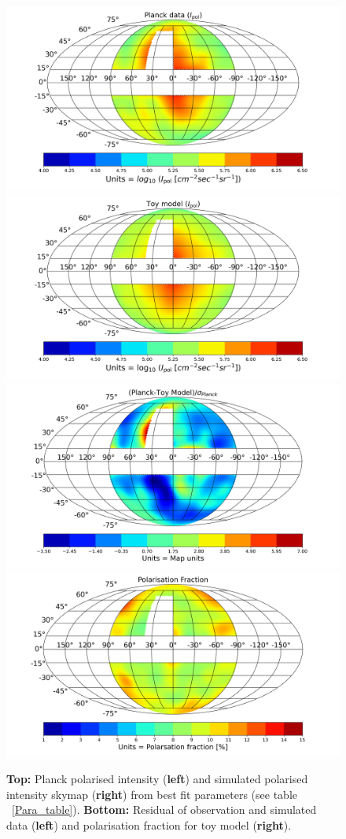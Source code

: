 \documentclass[usenatbib]{mnras}
\begin{document}
\begin{figure}
\centering
\includegraphics[width =0.49\linewidth]{Images/Feb-09-2022_Planck_Sky_Map.png}%
\includegraphics[width=0.49\linewidth]{Images/Feb-09-2022Ver1_Skymap_Bstr_3_Btur_6_Rmag_5_Zmag_7_norm_3.76e-13.png}
\includegraphics[width = 0.49\linewidth]{Images/Feb-09-2022_Residue_Bstr_3_Btur_6_Rmag_5_Zmag_7_norm_3.76e-13.png}%
\includegraphics[width =0.49\linewidth]{Images/Feb-09-2022_Pol_Frac_30GHz_Total_Skymap_Bstr_3_Btur_6_Rmag_5_Zmag_7_norm_2.61e-14.png}
\caption{\textbf{Top:} Planck polarised intensity (\textbf{left}) and simulated polarised intensity skymap (\textbf{right}) from best fit parameters (see table ~\ref{Para_table}). \textbf{Bottom:} Residual of observation and simulated data (\textbf{left}) and polarisation fraction for toy model (\textbf{right}).}
\label{fig:Skymaps}
\end{figure}
\end{document}
